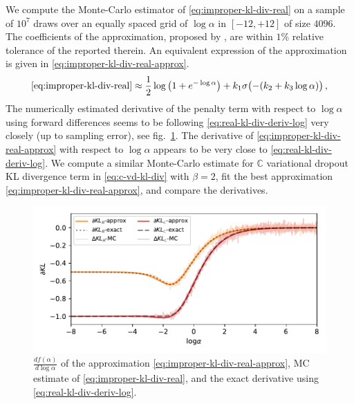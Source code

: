 \documentclass[a4paper,10pt,twocolumn]{article}
\newcommand{\cplx}{\mathbb{C}}
\begin{document}
We compute the Monte-Carlo estimator of \eqref{eq:improper-kl-div-real} on a sample of $10^7$
draws over an equally spaced grid of $\log \alpha$ in $[-12, +12]$ of size $4096$. The
coefficients of the approximation, proposed by \citet{molchanov_variational_2017}, are
within $1\%$ relative tolerance of the reported therein. An equivalent expression of the
approximation is given in \eqref{eq:improper-kl-div-real-approx}.
\begin{equation}  \label{eq:improper-kl-div-real-approx}
  \eqref{eq:improper-kl-div-real}
  \approx
    \frac12 \log{\bigl(1 + e^{-\log \alpha}\bigr)}
    + k_1 \sigma\bigl(- (k_2 + k_3 \log \alpha)\bigr)
  \,,
\end{equation}
The numerically estimated derivative of the penalty term with respect to $\log \alpha$ using
forward differences seems to be following \eqref{eq:real-kl-div-deriv-log} very closely (up to
sampling error), see fig.~\ref{fig:molchanov-derivative-replica}. The derivative of
\eqref{eq:improper-kl-div-real-approx} with respect to $\log \alpha$ appears to be very close
to \eqref{eq:real-kl-div-deriv-log}. We compute a similar Monte-Carlo estimate for
$\cplx$ variational dropout KL divergence term in \eqref{eq:c-vd-kl-div} with $\beta = 2$,
fit the best approximation \eqref{eq:improper-kl-div-real-approx}, and compare the derivatives.

\begin{figure}[!t]
  \centering
  \includegraphics[width=\columnwidth]{grad_log.pdf}
  \caption{$\tfrac{d f(\alpha)}{d \log{\alpha}}$ of the approximation
  \eqref{eq:improper-kl-div-real-approx}, MC estimate of \eqref{eq:improper-kl-div-real},
  and the exact derivative using \eqref{eq:real-kl-div-deriv-log}.}
  \label{fig:molchanov-derivative-replica}
\end{figure}
\end{document}

